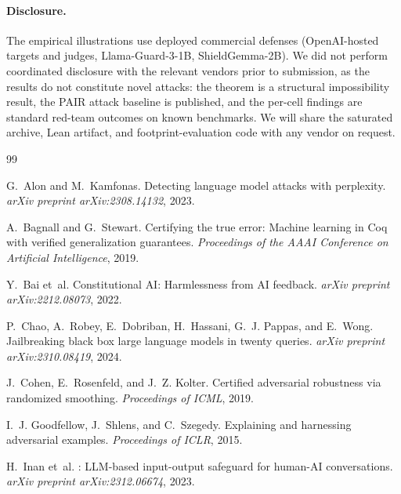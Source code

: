 \documentclass[11pt]{article}
\begin{document}
\paragraph{Disclosure.}
The empirical illustrations use deployed commercial defenses
(OpenAI-hosted targets and judges, Llama-Guard-3-1B, ShieldGemma-2B).
We did not perform coordinated disclosure with the relevant vendors
prior to submission, as the results do not constitute novel attacks:
the theorem is a structural impossibility result, the PAIR attack
baseline is published, and the per-cell findings are standard
red-team outcomes on known benchmarks. We will share the saturated
archive, Lean artifact, and footprint-evaluation code with any vendor
on request.


\begin{thebibliography}{99}

G.~Alon and M.~Kamfonas.
\newblock Detecting language model attacks with perplexity.
\newblock \emph{arXiv preprint arXiv:2308.14132}, 2023.

A.~Bagnall and G.~Stewart.
\newblock Certifying the true error: Machine learning in {Coq} with
  verified generalization guarantees.
\newblock \emph{Proceedings of the AAAI Conference on Artificial
Intelligence}, 2019.

Y.~Bai et~al.
\newblock Constitutional {AI}: Harmlessness from {AI} feedback.
\newblock \emph{arXiv preprint arXiv:2212.08073}, 2022.

P.~Chao, A.~Robey, E.~Dobriban, H.~Hassani, G.~J. Pappas, and
E.~Wong.
\newblock Jailbreaking black box large language models in twenty queries.
\newblock \emph{arXiv preprint arXiv:2310.08419}, 2024.

J.~Cohen, E.~Rosenfeld, and J.~Z. Kolter.
\newblock Certified adversarial robustness via randomized smoothing.
\newblock \emph{Proceedings of ICML}, 2019.

I.~J. Goodfellow, J.~Shlens, and C.~Szegedy.
\newblock Explaining and harnessing adversarial examples.
\newblock \emph{Proceedings of ICLR}, 2015.

H.~Inan et~al.
: {LLM}-based input-output safeguard for
  human-{AI} conversations.
\newblock \emph{arXiv preprint arXiv:2312.06674}, 2023.


\end{thebibliography}
\end{document}
